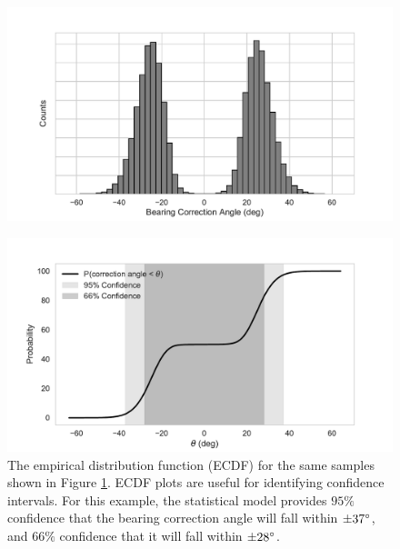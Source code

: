 \documentclass[paper=a4, fontsize=11pt]{scrartcl}
\numberwithin{equation}{section}		%
\numberwithin{figure}{section}			%
\numberwithin{table}{section}				%
\begin{document}
\begin{appendices}
\begin{figure}[H]
  
  \label{fig:correction_hist}
  \centering
  \includegraphics[width=1.0\textwidth]{figures/correction_hist.pdf}
\end{figure}


\begin{figure}[H]
  \caption{
  The empirical distribution function (ECDF) for the same samples shown in Figure \ref{fig:correction_hist}.  ECDF plots are useful for identifying confidence intervals.  For this example, the statistical model provides  $95\%$ confidence that the bearing correction angle will fall within $\pm 37\degree$, and  $66\%$ confidence that it will fall within $\pm 28\degree$.
  }
  \label{fig:correction_ecdf}
  \centering
  \includegraphics[width=1.0\textwidth]{figures/correction_ecdf.pdf}
\end{figure}



\end{appendices}
\end{document}
